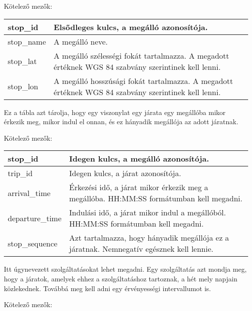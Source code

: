 \noindent Kötelező mezők:

\bigskip

\begin{tabular}{|p{3cm}|p{10cm}|}
\hline
stop\_id & Elsődleges kulcs, a megálló azonosítója. \\
\hline
stop\_name & A megálló neve. \\
\hline
stop\_lat & A megálló szélességi fokát tartalmazza. A megadott értéknek WGS 84 szabvány szerintinek kell lenni. \\
\hline
stop\_lon & A megálló hosszúsági fokát tartalmazza. A megadott értéknek WGS 84 szabvány szerintinek kell lenni. \\
\hline
\end{tabular}


Ez a tábla azt tárolja, hogy egy viszonylat egy járata egy megállóba mikor érkezik meg, mikor indul el onnan, és ez hányadik megállója az adott járatnak.

\medskip

\noindent Kötelező mezők:

\bigskip

\begin{tabular}{|p{3cm}|p{10cm}|}
\hline
stop\_id & Idegen kulcs, a megálló azonosítója. \\
\hline
trip\_id & Idegen kulcs, a járat azonosítója. \\
\hline
arrival\_time & Érkezési idő, a járat mikor érkezik meg a megállóba. HH:MM:SS formátumban kell megadni. \\
\hline
departure\_time & Indulási idő, a járat mikor indul a megállóból. HH:MM:SS formátumban kell megadni. \\
\hline
stop\_sequence & Azt tartalmazza, hogy hányadik megállója ez a járatnak. Nemnegatív egésznek kell lennie. \\
\hline
\end{tabular}


Itt úgynevezett szolgáltatásokat lehet megadni. Egy szolgáltatás azt mondja meg, hogy a járatok, amelyek ehhez a szolgáltatáshoz tartoznak, a hét mely napjain közlekednek. Továbbá meg kell adni egy érvényességi intervallumot is.

\medskip

\noindent Kötelező mezők:

\bigskip

